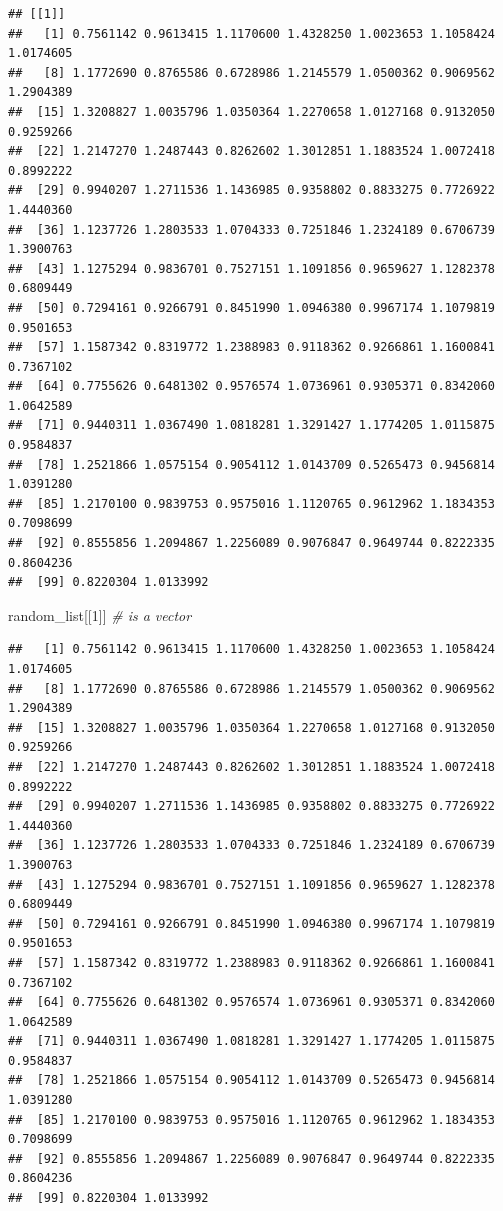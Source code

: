 \documentclass[
]{book}
\newenvironment{Shaded}{\begin{snugshade}}{\end{snugshade}}
\newcommand{\CommentTok}[1]{\textcolor[rgb]{0.56,0.35,0.01}{\textit{#1}}}
\newcommand{\DecValTok}[1]{\textcolor[rgb]{0.00,0.00,0.81}{#1}}
\newcommand{\NormalTok}[1]{#1}
\begin{document}
\begin{verbatim}
## [[1]]
##   [1] 0.7561142 0.9613415 1.1170600 1.4328250 1.0023653 1.1058424 1.0174605
##   [8] 1.1772690 0.8765586 0.6728986 1.2145579 1.0500362 0.9069562 1.2904389
##  [15] 1.3208827 1.0035796 1.0350364 1.2270658 1.0127168 0.9132050 0.9259266
##  [22] 1.2147270 1.2487443 0.8262602 1.3012851 1.1883524 1.0072418 0.8992222
##  [29] 0.9940207 1.2711536 1.1436985 0.9358802 0.8833275 0.7726922 1.4440360
##  [36] 1.1237726 1.2803533 1.0704333 0.7251846 1.2324189 0.6706739 1.3900763
##  [43] 1.1275294 0.9836701 0.7527151 1.1091856 0.9659627 1.1282378 0.6809449
##  [50] 0.7294161 0.9266791 0.8451990 1.0946380 0.9967174 1.1079819 0.9501653
##  [57] 1.1587342 0.8319772 1.2388983 0.9118362 0.9266861 1.1600841 0.7367102
##  [64] 0.7755626 0.6481302 0.9576574 1.0736961 0.9305371 0.8342060 1.0642589
##  [71] 0.9440311 1.0367490 1.0818281 1.3291427 1.1774205 1.0115875 0.9584837
##  [78] 1.2521866 1.0575154 0.9054112 1.0143709 0.5265473 0.9456814 1.0391280
##  [85] 1.2170100 0.9839753 0.9575016 1.1120765 0.9612962 1.1834353 0.7098699
##  [92] 0.8555856 1.2094867 1.2256089 0.9076847 0.9649744 0.8222335 0.8604236
##  [99] 0.8220304 1.0133992
\end{verbatim}

\begin{Shaded}
\begin{Highlighting}[]
\NormalTok{random_list[[}\DecValTok{1}\NormalTok{]] }\CommentTok{# is a vector}
\end{Highlighting}
\end{Shaded}

\begin{verbatim}
##   [1] 0.7561142 0.9613415 1.1170600 1.4328250 1.0023653 1.1058424 1.0174605
##   [8] 1.1772690 0.8765586 0.6728986 1.2145579 1.0500362 0.9069562 1.2904389
##  [15] 1.3208827 1.0035796 1.0350364 1.2270658 1.0127168 0.9132050 0.9259266
##  [22] 1.2147270 1.2487443 0.8262602 1.3012851 1.1883524 1.0072418 0.8992222
##  [29] 0.9940207 1.2711536 1.1436985 0.9358802 0.8833275 0.7726922 1.4440360
##  [36] 1.1237726 1.2803533 1.0704333 0.7251846 1.2324189 0.6706739 1.3900763
##  [43] 1.1275294 0.9836701 0.7527151 1.1091856 0.9659627 1.1282378 0.6809449
##  [50] 0.7294161 0.9266791 0.8451990 1.0946380 0.9967174 1.1079819 0.9501653
##  [57] 1.1587342 0.8319772 1.2388983 0.9118362 0.9266861 1.1600841 0.7367102
##  [64] 0.7755626 0.6481302 0.9576574 1.0736961 0.9305371 0.8342060 1.0642589
##  [71] 0.9440311 1.0367490 1.0818281 1.3291427 1.1774205 1.0115875 0.9584837
##  [78] 1.2521866 1.0575154 0.9054112 1.0143709 0.5265473 0.9456814 1.0391280
##  [85] 1.2170100 0.9839753 0.9575016 1.1120765 0.9612962 1.1834353 0.7098699
##  [92] 0.8555856 1.2094867 1.2256089 0.9076847 0.9649744 0.8222335 0.8604236
##  [99] 0.8220304 1.0133992
\end{verbatim}
\end{document}
